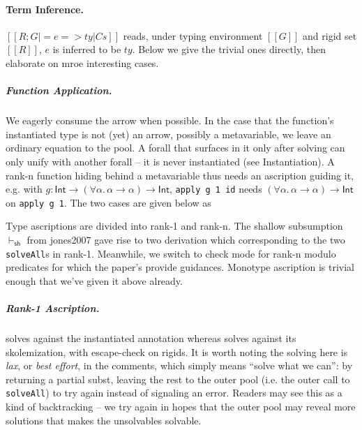 \documentclass[a4paper, 11pt]{article}
\theoremstyle{remark}
\begin{document}

\paragraph{Term Inference.} $[[R ; G |= e => ty | Cs]]$ reads,
under typing environment $[[G]]$ and rigid set $[[R]]$,
$e$ is inferred to be $ty$. Below we give the trivial ones directly, then elaborate
on mroe interesting cases.


\subparagraph{Function Application.} We eagerly consume the arrow when possible. In the
case that the function's instantiated type is not (yet) an arrow, possibly
a metavariable, we leave an ordinary equation to the pool. A forall that surfaces in it only
after solving can only unify with another forall -- it is never instantiated (see Instantiation). A rank-n
function hiding behind a metavariable thus needs an ascription guiding it, e.g. with
$g : \textsf{Int}\to(\forall\alpha.\,\alpha\to\alpha)\to\textsf{Int}$, \texttt{apply g 1 id}
needs $(\forall\alpha.\,\alpha\to\alpha)\to\textsf{Int}$ on \texttt{apply g 1}.
The two cases are given below as

\begin{mathpar}
\end{mathpar}

Type ascriptions are divided into rank-1 and rank-n. The shallow subsumption $\vdash_\textsf{sh}$
from jones2007 gave rise to two derivation 
which corresponding to the two \texttt{solveAll}s in rank-1. Meanwhile, we switch to
check mode for rank-n modulo predicates for which the paper's  provide
guidances.
Monotype ascription is trivial enough that we've given it above already.

\subparagraph{Rank-1 Ascription.}  solves against the instantiated
annotation whereas  solves against its skolemization, with escape-check
on rigids. It is worth noting the solving here is \emph{lax}, or \emph{best effort},
in the comments, which simply means ``solve what we can'': by
returning a partial subst, leaving the rest to the outer pool
(i.e. the outer call to \texttt{solveAll}) to try again instead of signaling an error.
Readers may see this as a kind of backtracking -- we try again in hopes that the outer pool
may reveal more solutions that makes the unsolvables solvable.
\end{document}
